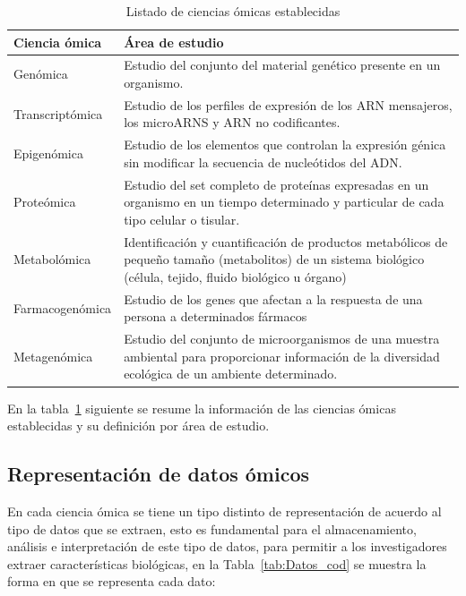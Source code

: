 \begin{table}[!h]
    \scriptsize
    \centering
    \caption{Listado de ciencias ómicas establecidas}
    
    \begin{tabular}{
    >{\centering\arraybackslash}m{4cm} 
    >{\centering\arraybackslash}m{9cm}}
\hline 
        \textbf{Ciencia ómica} & 
        \textbf{Área de estudio}
\\      
    \hline \hline 

    Genómica &
    Estudio del conjunto del material genético presente en un organismo.
\\
    \hline
    Transcriptómica &
    Estudio de los perfiles de expresión de los ARN mensajeros, los microARNS y ARN no codificantes.
\\
    \hline
    Epigenómica &
    Estudio de los elementos que controlan la expresión génica sin modificar la secuencia de nucleótidos del ADN.
\\
    \hline
     Proteómica &
     Estudio del set completo de proteínas expresadas en un organismo en un tiempo determinado y particular de cada tipo celular o tisular.
\\
     \hline
     Metabolómica &
     Identificación y cuantificación de productos metabólicos de pequeño tamaño (metabolitos) de un sistema biológico (célula, tejido, fluido biológico u órgano)
\\
     \hline
     Farmacogenómica &
     Estudio de los genes que afectan a la respuesta de una persona a determinados fármacos
\\
     \hline
     Metagenómica &
     Estudio del conjunto de microorganismos de una muestra ambiental para proporcionar información de la diversidad ecológica de un ambiente determinado.
\\
    
\hline
    \end{tabular}
    \label{tab:List_omic}
\end{table}

En la tabla~\ref{tab:List_omic} siguiente se resume la información de las ciencias ómicas establecidas y su definición por área de estudio.



\subsection{Representación de datos ómicos}

En cada ciencia ómica se tiene un tipo distinto de representación de acuerdo al tipo de datos que se extraen, esto es fundamental para el almacenamiento, análisis e interpretación de este tipo de datos, para permitir a los investigadores extraer características biológicas, en la Tabla~\ref{tab:Datos_cod} se muestra la forma en que se representa cada dato:

